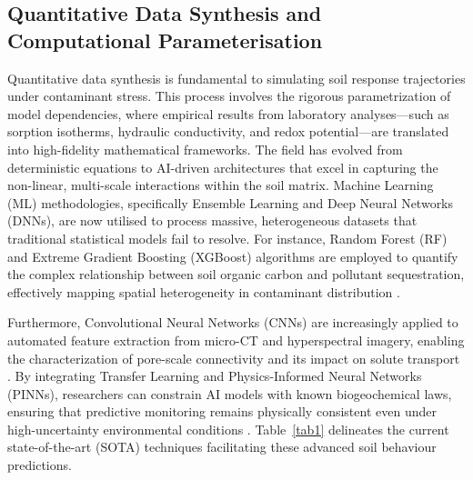 \documentclass[preprint,12pt]{elsarticle}            %
\begin{document}
\subsection{Quantitative Data Synthesis and Computational
    Parameterisation}\label{sec2.2}

Quantitative data synthesis is fundamental to simulating soil response
trajectories under contaminant stress. This process involves the rigorous
parametrization of model dependencies, where empirical results from laboratory
analyses---such as sorption isotherms, hydraulic conductivity, and redox
potential---are translated into high-fidelity mathematical frameworks. The
field has evolved from deterministic equations to AI-driven architectures that
excel in capturing the non-linear, multi-scale interactions within the soil
matrix. Machine Learning (ML) methodologies, specifically Ensemble Learning
and Deep Neural Networks (DNNs), are now utilised to process massive,
heterogeneous datasets that traditional statistical models fail to resolve.
For instance, Random Forest (RF) and Extreme Gradient Boosting (XGBoost)
algorithms are employed to quantify the complex relationship between soil
organic carbon and pollutant sequestration, effectively mapping spatial
heterogeneity in contaminant distribution \cite{Wadoux2024,Sahab2025}.

Furthermore, Convolutional Neural Networks (CNNs) are increasingly applied to
automated feature extraction from micro-CT and hyperspectral imagery, enabling
the characterization of pore-scale connectivity and its impact on solute
transport \cite{Demiraletal2026}. By integrating Transfer Learning and
Physics-Informed Neural Networks (PINNs), researchers can constrain AI models
with known biogeochemical laws, ensuring that predictive monitoring remains
physically consistent even under high-uncertainty environmental conditions
\cite{Karpatne2024,Nguyen2025}. Table~\ref{tab1} delineates the current
state-of-the-art (SOTA) techniques facilitating these advanced soil behaviour
predictions.
\end{document}
